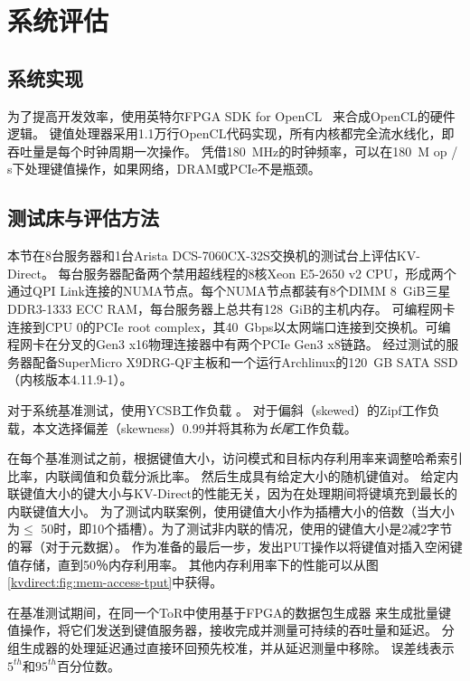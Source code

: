 \section{系统评估}
\label{kvdirect:sec:eval}
\label{kvdirect:sec:evaluation}
\label{kvdirect:sec:system-benchmark}

\subsection{系统实现}

为了提高开发效率，使用英特尔FPGA SDK for OpenCL~ \cite {aoc}来合成OpenCL的硬件逻辑。
键值处理器采用1.1万行OpenCL代码实现，所有内核都完全流水线化，即吞吐量是每个时钟周期一次操作。
凭借180~MHz的时钟频率，可以在180~M op / s下处理键值操作，如果网络，DRAM或PCIe不是瓶颈。



\subsection{测试床与评估方法}

本节在8台服务器和1台Arista DCS-7060CX-32S交换机的测试台上评估KV-Direct。
每台服务器配备两个禁用超线程的8核Xeon E5-2650 v2 CPU，形成两个通过QPI Link连接的NUMA节点。每个NUMA节点都装有8个DIMM 8~GiB三星DDR3-1333 ECC RAM，每台服务器上总共有128~GiB的主机内存。
可编程网卡~ \cite {caulfield2016cloud}连接到CPU 0的PCIe root complex，其40~Gbps以太网端口连接到交换机。可编程网卡在分叉的Gen3 x16物理连接器中有两个PCIe Gen3 x8链路。
经过测试的服务器配备SuperMicro X9DRG-QF主板和一个运行Archlinux的120~GB SATA SSD（内核版本4.11.9-1）。

对于系统基准测试，使用YCSB工作负载 \cite {cooper2010benchmarking}。
对于偏斜（skewed）的Zipf工作负载，本文选择偏差（skewness）0.99并将其称为\textit {长尾}工作负载。

在每个基准测试之前，根据键值大小，访问模式和目标内存利用率来调整哈希索引比率，内联阈值和负载分派比率。
然后生成具有给定大小的随机键值对。
给定内联键值大小的键大小与KV-Direct的性能无关，因为在处理期间将键填充到最长的内联键值大小。
为了测试内联案例，使用键值大小作为插槽大小的倍数（当大小为$ \leq $ 50时，即10个插槽）。为了测试非内联的情况，使用的键值大小是2减2字节的幂（对于元数据）。
作为准备的最后一步，发出PUT操作以将键值对插入空闲键值存储，直到50％内存利用率。
其他内存利用率下的性能可以从图 \ref {kvdirect:fig:mem-access-tput}中获得。

在基准测试期间，在同一个ToR中使用基于FPGA的数据包生成器 \cite {li2016clicknp}来生成批量键值操作，将它们发送到键值服务器，接收完成并测量可持续的吞吐量和延迟。
分组生成器的处理延迟通过直接环回预先校准，并从延迟测量中移除。
误差线表示$ 5^{th} $和$ 95^{th} $百分位数。

